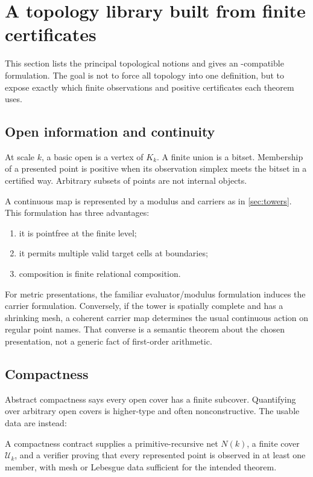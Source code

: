 
\section{A topology library built from finite certificates}
\label{sec:library}

This section lists the principal topological notions and gives an \ipra-compatible formulation.  The goal is not to force all topology into one definition, but to expose exactly which finite observations and positive certificates each theorem uses.

\subsection{Open information and continuity}

At scale $k$, a basic open is a vertex of $K_k$.  A finite union is a bitset.  Membership of a presented point is positive when its observation simplex meets the bitset in a certified way.  Arbitrary subsets of points are not internal objects.

A continuous map is represented by a modulus and carriers as in \cref{sec:towers}.  This formulation has three advantages:
\begin{enumerate}
  \item it is pointfree at the finite level;
  \item it permits multiple valid target cells at boundaries;
  \item composition is finite relational composition.
\end{enumerate}

For metric presentations, the familiar evaluator/modulus formulation induces the carrier formulation.  Conversely, if the tower is spatially complete and has a shrinking mesh, a coherent carrier map determines the usual continuous action on regular point names.  That converse is a semantic theorem about the chosen presentation, not a generic fact of first-order arithmetic.

\subsection{Compactness}

Abstract compactness says every open cover has a finite subcover.  Quantifying over arbitrary open covers is higher-type and often nonconstructive.  The usable data are instead:

\begin{definition}
A compactness contract supplies a primitive-recursive net $N(k)$, a finite cover $\mathcal U_k$, and a verifier proving that every represented point is observed in at least one member, with mesh or Lebesgue data sufficient for the intended theorem.
\end{definition}

